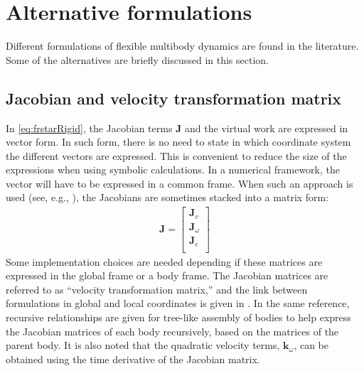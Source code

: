 \documentclass[wes, manuscript]{copernicus}
\renewcommand{\v}[1]{\boldsymbol{#1}}
\newcommand{\m}[1]{\boldsymbol{#1}}
\begin{document}
\section{Alternative formulations}
\label{sec:AlternativeFormulations}

Different formulations of flexible multibody dynamics are found in the literature.
Some of the alternatives are briefly discussed in this section.


\subsection{Jacobian and velocity transformation matrix}
In \autoref{eq:frstarRigid}, the Jacobian terms $\v{J}$ and the virtual work are expressed in vector form.
In such form, there is no need to state in which coordinate system the different vectors are expressed.
This is convenient to reduce the size of the expressions when using symbolic calculations.
In a numerical framework, the vector will have to be expressed in a common frame.
When such an approach is used (see, e.g., \cite{Lemmer:2018, branlard:2019flex}), the Jacobians are sometimes stacked into a matrix form:
\begin{align}
\m{J} = 
    \begin{bmatrix}
    \v{J}_v \\
    \v{J}_\omega\\
    \v{J}_e \\
    \end{bmatrix}
\end{align}
Some implementation choices are needed depending if these matrices are expressed in the global frame or a body frame.
    The Jacobian matrices are referred to as ``velocity transformation matrix,'' and the link between formulations in global and local coordinates is given in \cite{branlard:2019flex}.
    In the same reference, recursive relationships are given for tree-like assembly of bodies to help express the Jacobian matrices of each body recursively, based on the matrices of the parent body.
    It is also noted that the quadratic velocity terms, $\v{k}_\omega$, can be obtained using the time derivative of the Jacobian matrix.
\end{document}
